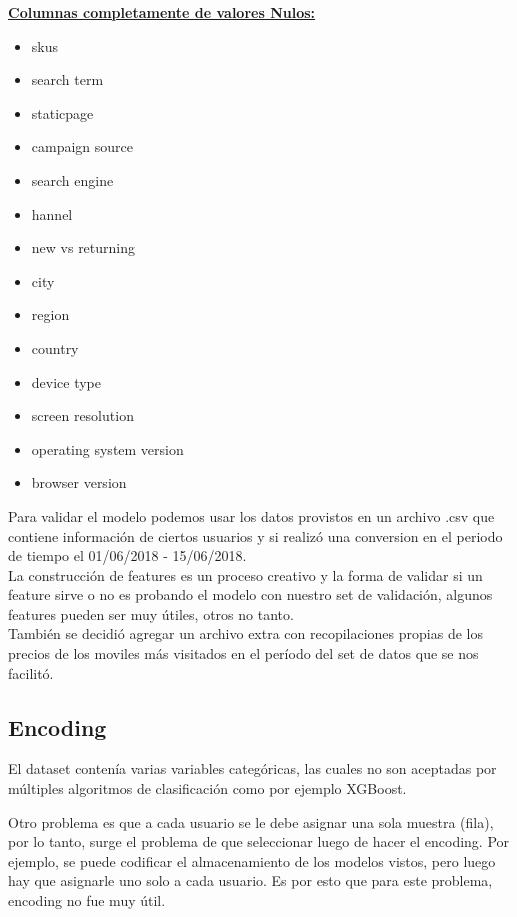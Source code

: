 \documentclass[a4paper ,12pt]{article}
\begin{document}
\textbf{\underline{Columnas completamente de valores Nulos:}}

\begin{itemize}
	
		\item skus
		\item search term
		\item staticpage
		\item campaign source
		\item search engine
		\item hannel
		\item new vs returning
		\item city
		\item region
		\item country
		\item device type
		\item screen resolution
		\item operating system version
		\item browser version
		
\end{itemize}


Para validar el modelo podemos usar los datos provistos en un archivo .csv que contiene información de ciertos usuarios y si realizó una conversion en el periodo de tiempo el 01/06/2018 - 15/06/2018. \\

La construcción de features es un proceso creativo y la forma de validar si un
feature sirve o no es probando el modelo con nuestro set de validación, algunos
features pueden ser muy útiles, otros no tanto. \\

También se decidió agregar un archivo extra con recopilaciones propias de los precios de los moviles más visitados en el período del set de datos que se nos facilitó.


\subsection{Encoding}

El dataset contenía varias variables categóricas, las cuales no son aceptadas por
múltiples algoritmos de clasificación como por ejemplo XGBoost.

Otro problema es que a cada usuario se le debe asignar una sola muestra (fila), por lo tanto, surge el problema de que seleccionar luego de hacer el encoding. Por ejemplo, se puede codificar el almacenamiento de los modelos vistos, pero luego hay que asignarle uno solo a cada usuario. Es por esto que para este problema, encoding no fue muy útil.
\end{document}
